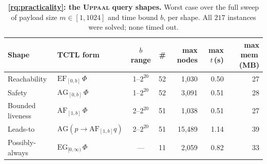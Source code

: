 \begin{table}[t]\centering
\caption{\textbf{\ref{rq:practicality}: the \textsc{Uppaal} query shapes.} Worst case over the full
sweep of payload size $m\in[1,1024]$ and time bound $b$, per shape. All $217$ instances were solved;
none timed out.}\label{tab:rq2}
\small\setlength{\tabcolsep}{5pt}
\begin{tabular}{llcrrrr}
\toprule
Shape & TCTL form & $b$ range & \# & max nodes & max $t$\,(s) & max mem\,(MB)\\
\midrule
Reachability & $\mathrm{EF}_{[0,b]}\,\Phi$ & 1--$2^{20}$ & 52 & 1{,}030 & 0.50 & 27 \\
Safety & $\mathrm{AG}_{[0,b]}\,\Phi$ & 1--$2^{20}$ & 52 & 3{,}091 & 0.51 & 28 \\
Bounded liveness & $\mathrm{AF}_{[1,b]}\,\Phi$ & 2--$2^{20}$ & 51 & 1{,}038 & 0.51 & 27 \\
Leads-to & $\mathrm{AG}(p\!\rightarrow\!\mathrm{AF}_{[1,b]}q)$ & 2--$2^{20}$ & 51 & 15{,}489 & 1.14 & 39 \\
Possibly-always & $\mathrm{EG}_{[0,\infty)}\,\Phi$ & --- & 11 & 2{,}059 & 0.82 & 33 \\
\bottomrule
\end{tabular}
\end{table}

